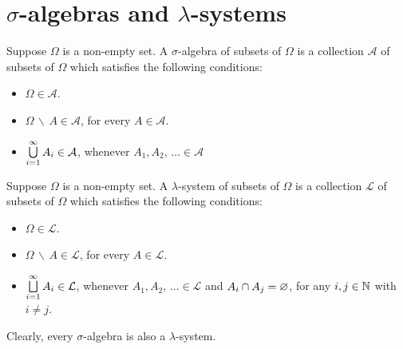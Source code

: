 

\section{$\sigma$-algebras and $\lambda$-systems}
\setcounter{theorem}{0}
\setcounter{equation}{0}

\renewcommand{\theenumi}{\roman{enumi}}
\renewcommand{\labelenumi}{\textnormal{(\theenumi)}$\;\;$}

\begin{definition}
\mbox{}\vskip 0.1cm
\noindent
Suppose $\Omega$ is a non-empty set.
A $\sigma$-algebra of subsets of $\Omega$ is a collection $\mathcal{A}$ of subsets of $\Omega$
which satisfies the following conditions:
\begin{itemize}
\item	$\Omega \in \mathcal{A}$.
\item	$\Omega\,\backslash\,A \in \mathcal{A}$, for every $A \in \mathcal{A}$.
\item	$\underset{i=1}{\overset{\infty}{\textnormal{\large$\bigcup$}}}\,A_{i} \in \mathcal{A}$, whenever $A_{1}, A_{2},\,\ldots \in \mathcal{A}$
\end{itemize}
\end{definition}

\begin{definition}
\mbox{}\vskip 0.1cm
\noindent
Suppose $\Omega$ is a non-empty set.
A $\lambda$-system of subsets of $\Omega$ is a collection $\mathcal{L}$ of subsets of $\Omega$
which satisfies the following conditions:
\begin{itemize}
\item	$\Omega \in \mathcal{L}$.
\item	$\Omega\,\backslash\,A \in \mathcal{L}$, for every $A \in \mathcal{L}$.
\item	$\underset{i=1}{\overset{\infty}{\textnormal{\large$\bigsqcup$}}}\,A_{i} \in \mathcal{L}$,
		whenever $A_{1}, A_{2},\,\ldots \in \mathcal{L}$ and $A_{i} \cap A_{j} = \varnothing$, for any $i, j \in \mathbb{N}$ with $i \neq j$.
\end{itemize}
\end{definition}

\begin{remark}\quad
Clearly, every $\sigma$-algebra is also a $\lambda$-system.
\end{remark}


